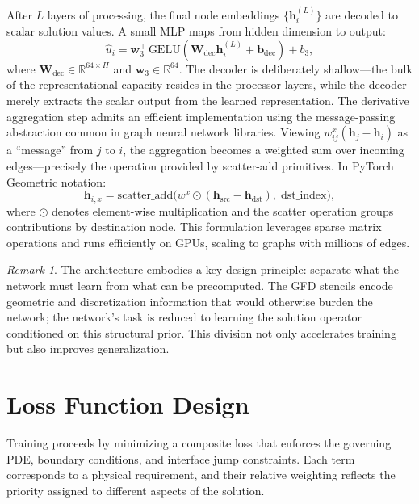 \documentclass[11pt]{article}
\theoremstyle{definition}
\theoremstyle{remark}
\newtheorem{remark}{Remark}
\theoremstyle{plain}
\begin{document}
After $L$ layers of processing, the final node embeddings $\{\mathbf{h}_i^{(L)}\}$ are decoded to scalar solution values. A small MLP maps from hidden dimension to output:
\begin{equation}
    \hat{u}_i = \mathbf{w}_3^\top \, \text{GELU}(\mathbf{W}_{\text{dec}} \mathbf{h}_i^{(L)} + \mathbf{b}_{\text{dec}}) + b_3,
\end{equation}
where $\mathbf{W}_{\text{dec}} \in \mathbb{R}^{64 \times H}$ and $\mathbf{w}_3 \in \mathbb{R}^{64}$. The decoder is deliberately shallow---the bulk of the representational capacity resides in the processor layers, while the decoder merely extracts the scalar output from the learned representation. The derivative aggregation step admits an efficient implementation using the message-passing abstraction common in graph neural network libraries. Viewing $w_{ij}^x (\mathbf{h}_j - \mathbf{h}_i)$ as a ``message'' from $j$ to $i$, the aggregation becomes a weighted sum over incoming edges---precisely the operation provided by scatter-add primitives. In PyTorch Geometric notation:
\begin{equation}
    \mathbf{h}_{i,x} = \text{scatter\_add}\bigl( w^x \odot (\mathbf{h}_{\text{src}} - \mathbf{h}_{\text{dst}}), \; \text{dst\_index} \bigr),
\end{equation}
where $\odot$ denotes element-wise multiplication and the scatter operation groups contributions by destination node. This formulation leverages sparse matrix operations and runs efficiently on GPUs, scaling to graphs with millions of edges.

\begin{remark}
    The architecture embodies a key design principle: separate what the network must learn from what can be precomputed. The GFD stencils encode geometric and discretization information that would otherwise burden the network; the network's task is reduced to learning the solution operator conditioned on this structural prior. This division not only accelerates training but also improves generalization.
\end{remark}

\section{Loss Function Design}
\label{sec:loss}

Training proceeds by minimizing a composite loss that enforces the governing PDE, boundary conditions, and interface jump constraints. Each term corresponds to a physical requirement, and their relative weighting reflects the priority assigned to different aspects of the solution.
\end{document}

